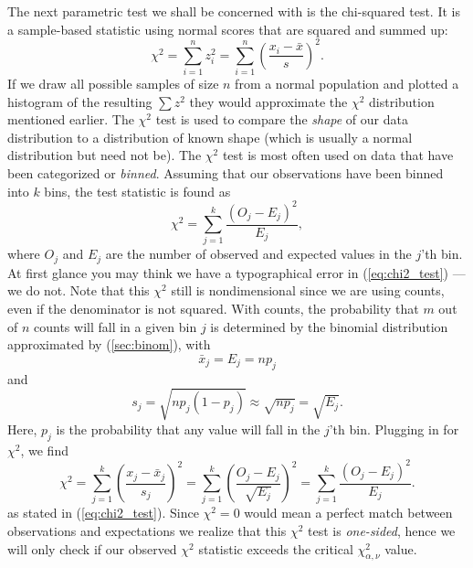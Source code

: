	The next parametric test we shall be concerned with is the chi-squared test.  It is a sample-based
statistic using normal scores that are squared and summed up:
\begin{equation}
\chi^2=\sum^n_{i=1}z_i^2=\sum^n_{i=1}\left(\frac{x_i-\bar{x}}{s}\right)^2.
\label{eq:ch:2_test}
\end{equation}
If we draw all possible samples of size $n$ from a normal population and plotted a histogram of the resulting $\sum z^2$ they would 
approximate the $\chi^2$ distribution mentioned earlier.  The $\chi^2$ test is used to compare the \emph{shape} of our data 
distribution to a distribution of known shape (which is usually a normal distribution but need not be).
	The $\chi^2$ test is most often used on data that have been categorized or \emph{binned}.  Assuming that 
our observations have been binned into $k$ bins, the test statistic is found as 
\begin{equation}
\chi^2=\sum^k_{j=1}\frac{(O_j-E_j)^2}{E_j},
\label{eq:chi2_test}
\end{equation}
where $O_j$ and $E_j$ are the number of observed and expected values in the $j$'th bin.  At first glance
you may think we have a typographical error in (\ref{eq:chi2_test}) --- we do not.  Note that this $\chi^2$ 
still is nondimensional since we are using counts, even if the denominator is not squared.  With 
counts, the probability that $m$ out of $n$ counts will fall in a given bin $j$ is determined by the 
binomial distribution approximated by (\ref{sec:binom}), with
\begin{equation}
\bar{x}_j = E_j = np_j
\end{equation}
and
\begin{equation}
s_j = \sqrt{np_j (1- p_j)} \approx \sqrt{np_j} = \sqrt{E_j}. 
\end{equation} 	
Here, $p_j$ is the probability that any value will fall in the $j$'th bin.  Plugging in for $\chi^2$, we find
\begin{equation}
\chi^2 = \sum^k_{j=1} \left ( \frac{x_j - \bar{x}_j}{s_j} \right) ^2 =
\sum^k_{j=1} \left( \frac{O_j - E_j}{\sqrt{E_j}} \right) ^2 = \sum^k_{j=1}
\frac{(O_j - E_j)^2}{E_j}.	 
\end{equation}
as stated in (\ref{eq:chi2_test}).  Since $\chi^2 = 0$ would mean a perfect match between observations and
expectations we realize that this $\chi^2$ test is \emph{one-sided}, hence we will only check if our observed $\chi^2$
statistic exceeds the critical $\chi^2_{\alpha, \nu}$ value.

